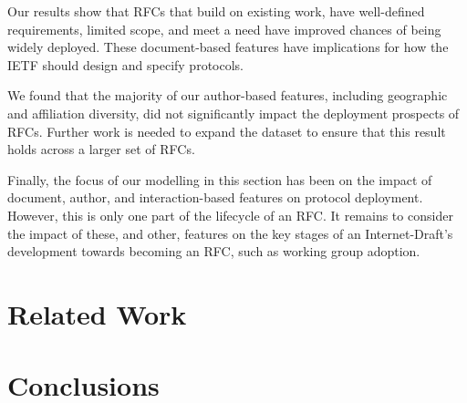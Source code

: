 \documentclass[twocolumn,10pt]{article}
\newcommand{\pb}[1]{\vspace{0.75ex}\noindent{\textbf{#1}}}
\begin{document}
\pb{Summary:}
Our results show that RFCs that build on existing work, have well-defined
requirements, limited scope, and meet a need have improved chances of being
widely deployed. These document-based features have implications for how
the IETF should design and specify protocols.

We found that the majority of our author-based features, including
geographic and affiliation diversity, did not significantly impact the
deployment prospects of RFCs. Further work is needed to expand the dataset
to ensure that this result holds across a larger set of RFCs.

Finally, the focus of our modelling in this section has been on the impact of
document, author, and interaction-based features on protocol deployment.
However, this is only one part of the lifecycle of an RFC. It remains to
consider the impact of these, and other, features on the key stages of an
Internet-Draft's development towards becoming an RFC, such as working group
adoption.

\section{Related Work}
\label{sec:related}

%
%



\section{Conclusions}
\label{sec:conclusions}
\end{document}
